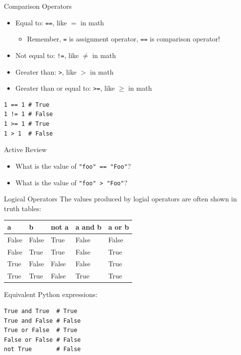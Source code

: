 \documentclass[smaller, aspectratio=1610]{beamer}
\begin{document}
\begin{frame}[label={sec:orgbd3366d},fragile]{Comparison Operators}
 \begin{itemize}
\item Equal to: \texttt{==}, like \(=\) in math

\begin{itemize}
\item Remember, \texttt{=} is assignment operator, \texttt{==} is comparison operator!
\end{itemize}

\item Not equal to: \texttt{!=}, like \(\ne\) in math
\item Greater than: \texttt{>}, like \(>\) in math
\item Greater than or equal to: \texttt{>=}, like \(\ge\) in math
\end{itemize}

\lstset{language=Python,label= ,caption= ,captionpos=b,numbers=none}
\begin{lstlisting}
1 == 1 # True
1 != 1 # False
1 >= 1 # True
1 > 1  # False
\end{lstlisting}

\begin{block}{Active Review}
\begin{itemize}
\item What is the value of \texttt{"foo" == "Foo"}?
\item What is the value of \texttt{"foo" > "Foo"}?
\end{itemize}
\end{block}
\end{frame}

\begin{frame}[label={sec:orge4e4345},fragile]{Logical Operators}
 The values produced by logial operators are often shown in truth tables:

\begin{center}
\begin{tabular}{|l|l|l|l|l|}
\hline
a & b & not a & a and b & a or b \\
\hline
False & False & True & False & False \\
False & True & True & False & True \\
True & False & False & False & True \\
True & True & False & True & True \\
\hline
\end{tabular}
\end{center}

Equivalent Python expressions:

\lstset{language=Python,label= ,caption= ,captionpos=b,numbers=none}
\begin{lstlisting}
True and True  # True
True and False # False
True or False  # True
False or False # False
not True       # False
\end{lstlisting}
\end{frame}
\end{document}
